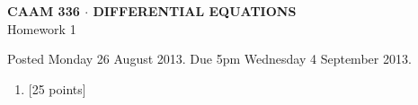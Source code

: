 \documentclass[10pt]{article}
\begin{document}
\vspace*{-5em}
\begin{center}
\large \textsf{\textbf{CAAM 336 $\cdot$ DIFFERENTIAL EQUATIONS}\\[0.5em]
Homework 1 }
\end{center}

Posted Monday 26 August 2013.  Due 5pm Wednesday 4 September 2013.

\begin{enumerate}\addtocounter{enumi}{0}
\item {[25 points]}\\  
\end{enumerate}
\end{document}
